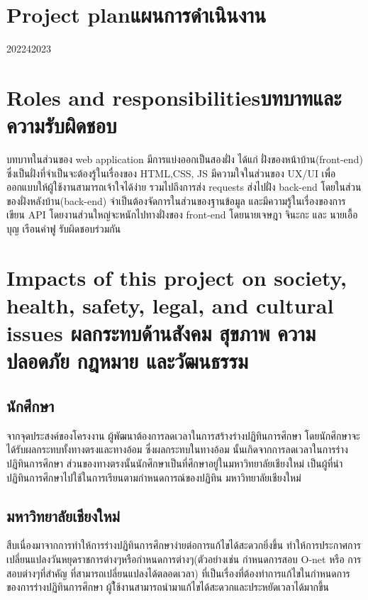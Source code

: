 \section{\ifenglish Project plan\else แผนการดำเนินงาน\fi}

\begin{plan}{1}{2022}{4}{2023}
\end{plan}

\section{\ifenglish Roles and responsibilities\else บทบาทและความรับผิดชอบ\fi}
    บทบาทในส่วนของ web application มีการแบ่งออกเป็นสองฝั่ง ได้แก่ 
%
ฝั่งของหน้าบ้าน(front-end) ซึ่งเป็นฝั่งที่จำเป็นจะต้องรู้ในเรื่องของ HTML,CSS, JS มีความใจในส่วนของ UX/UI เพื่อออกแบบให้ผู้ใช้งานสามารถเจ้าใจได้ง่าย 
%
รวมไปถึงการส่ง requests ส่งไปฝั่ง back-end โดยในส่วนของฝั่งหลังบ้าน(back-end) จำเป็นต้องจัดการในส่วนของฐานข้อมูล และมีความรู้ในเรื่องของการเขียน API 
%
โดยงานส่วนใหญ่จะหนักไปทางฝั่งของ front-end โดยนายเจษฎา จินะกะ และ นายเอื้อบุญ เรือนคำฟู รับผิดชอบร่วมกัน 

\section{\ifenglish%
Impacts of this project on society, health, safety, legal, and cultural issues
\else%
ผลกระทบด้านสังคม สุขภาพ ความปลอดภัย กฎหมาย และวัฒนธรรม
\fi}

\subsection{นักศึกษา}
    จากจุดประสงค์ของโครงงาน ผู้พัฒนาต้องการลดเวลาในการสร้างร่างปฏิทินการศึกษา โดยนักศึกษาจะได้รับผลกระทบทั้งทางตรงและทางอ้อม ซึ่งผลกระทบในทางอ้อม
%
นั้นเกิดจากการลดเวลาในการร่างปฏิทินการศึกษา ส่วนของทางตรงนั้นนักศึกษาเป็นที่ศึกษาอยู่ในมหาวิทยาลัยเชียงใหม่ เป็นผู้ที่นำปฏิทินการศึกษาไปใช้ในการเรียนตามกำหนดการณ์ของปฏิทิน มหาวิทยาลัยเชียงใหม่
\subsection{มหาวิทยาลัยเชียงใหม่}
    สืบเนื่องมาจากการทำให้การร่างปฏิทินการศึกษาง่ายต่อการแก้ไขได้สะดวกยิ่งขึ้น ทำให้การประกาศการเปลี่ยนแปลงวันหยุดราชการต่างๆหรือกำหนดการต่างๆ(ตัวอย่างเช่น กำหนดการสอบ O-net หรือ การสอบต่างๆที่สำคัญ ที่สามารถเปลี่ยนแปลงได้ตลอดเวลา)
%
    ที่เป็นเรื่องที่ต้องทำการแก้ไขในกำหนดการของการร่างปฏิทินการศึกษา ผู้ใ้ช้งานสามารถนำมาแก้ไขได้สะดวกและประหยัดเวลาได้มากขึ้น 
